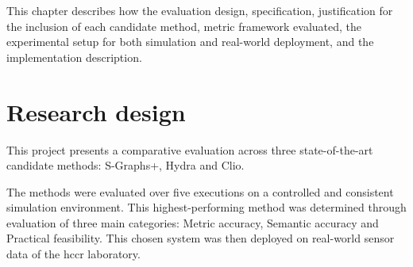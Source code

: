 %
%


This chapter describes how the evaluation design, specification, justification for the inclusion of each candidate method, metric framework evaluated, the experimental setup for both simulation and real-world deployment, and the implementation description.


\section{Research design}\label{sec:research-design}

This project presents a comparative evaluation across three state-of-the-art candidate methods: S-Graphs+\cite{s_graphs_plus}, Hydra\cite{hydra} and Clio\cite{clio}. 

The methods were evaluated over five executions on a controlled and consistent simulation environment. This highest-performing method was determined through evaluation of three main categories: Metric accuracy, Semantic accuracy and Practical feasibility. This chosen system was then deployed on real-world sensor data of the \gls{hccr} laboratory.

